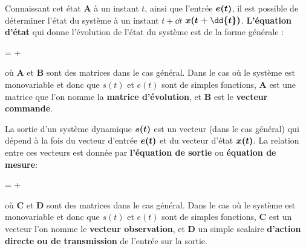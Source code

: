Connaissant cet état $\boldsymbol{A}$ à un instant $t$, ainsi que l'entrée 
$\boldsymbol{e}\boldsymbol{(t)}$, il est possible de déterminer l'état du système à un 
instant $t+\dd{t}$ $\bdx\boldsymbol{(t+\dd{t})}$. \textbf{L'équation d'état} 
qui donne l'évolution de l'état du système est de la forme générale :
\begin{bequation}
    \bdt= \bdxt +  \bdet
    \label{eq-etat}
\end{bequation}
où $\boldsymbol{A}$ et $\boldsymbol{B}$ sont des matrices dans le cas
général.
Dans le cas où le système est monovariable et donc que $s(t)$ et $e(t)$ sont
de simples fonctions, $\boldsymbol{A}$ est une matrice que l'on nomme la 
\textbf{matrice d'évolution}, et $\boldsymbol{B}$ est le 
\textbf{vecteur commande}.

La sortie d'un système dynamique $\boldsymbol{s}\boldsymbol{(t)}$ est un vecteur (dans le cas général) 
qui dépend à la fois du vecteur d'entrée $\boldsymbol{e}\boldsymbol{(t)}$ et du vecteur d'état $\boldsymbol{x}\boldsymbol{(t)}$. 
La relation entre ces vecteurs est donnée par \textbf{l'équation de sortie} ou
\textbf{équation de mesure}:
\begin{bequation}
    \bdst= \bdxt +  \bdet
    \label{eq-sortie}
\end{bequation}
où $\boldsymbol{C}$ et $\boldsymbol{D}$ sont des matrices dans le cas
général.
Dans le cas où le système est monovariable et donc que $s(t)$ et $e(t)$ sont
de simples fonctions, $\boldsymbol{C}$ est un vecteur l'on nomme le 
\textbf{vecteur observation}, et $\boldsymbol{D}$ un simple scalaire 
\textbf{d'action directe ou de transmission} de l'entrée sur la sortie.
